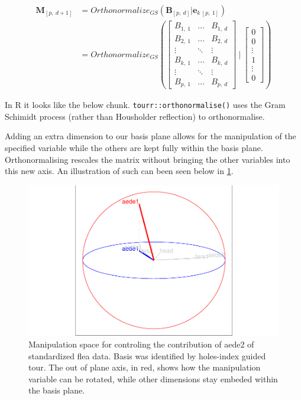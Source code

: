 \documentclass{monashthesis}
\begin{document}
\begin{align*}
  \textbf{M}_{[p,~d+1]}
  &= Orthonormalize_{GS}( \textbf{B}_{[p,~d]}|\textbf{e}_{k~[p,~1]} ) \\
  &= Orthonormalize_{GS}
  \left(
    \begin{bmatrix}
      B_{1,~1} & \dots  & B_{1,~d} \\
      B_{2,~1} & \dots  & B_{2,~d} \\
      \vdots   & \ddots & \vdots   \\
      B_{k,~1} & \dots  & B_{k,~d} \\
      \vdots   & \ddots & \vdots   \\
      B_{p,~1} & \dots  & B_{p,~d}
    \end{bmatrix}
  ~|~
    \begin{bmatrix}
      0 \\
      0 \\
      \vdots \\
      1 \\
      \vdots \\
      0
    \end{bmatrix}
  \right)
\end{align*}

In R it looks like the below chunk. \texttt{tourr::orthonormalise()}
uses the Gram Schimidt process (rather than Housholder reflection) to
orthonormalise.

Adding an extra dimension to our basis plane allows for the manipulation
of the specified variable while the others are kept fully within the
basis plane. Orthonormalising rescales the matrix without bringing the
other variables into this new axis. An illustration of such can been
seen below in \ref{fig:step2}.

\begin{figure}
\centering
\includegraphics{thesis_files/figure-latex/step2-1.pdf}
\caption{\label{fig:step2}Manipulation space for controling the contribution
of aede2 of standardized flea data. Basis was identified by holes-index
guided tour. The out of plane axis, in red, shows how the manipulation
variable can be rotated, while other dimensions stay embeded within the
basis plane.}
\end{figure}
\end{document}
